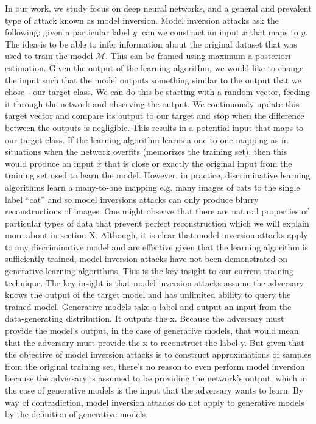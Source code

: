 In our work, we study focus on deep neural networks, and a general and prevalent type of attack known as model inversion. Model inversion attacks ask the following: given a particular label $\mathit{y}$, can we construct an input $\mathit{x}$ that maps to $\mathit{y}$. The idea is to be able to infer information about the original dataset that was used to train the model $\mathcal{M}$. This can be framed using maximum a posteriori estimation. Given the output of the learning algorithm, we would like to change the input such that the model outputs something similar to the output that we chose - our target class. We can do this be starting with a random vector, feeding it through the network and observing the output. We continuously update this target vector and compare its output to our target and stop when the difference between the outputs is negligible. This results in a potential input that maps to our target class. If the learning algorithm learns a one-to-one mapping as in situations when the network overfits (memorizes the training set), then this would produce an input $\hat{\mathit{x}}$ that is close or exactly the original input from the training set used to learn the model. However, in practice, discriminative learning algorithms learn a many-to-one mapping e.g. many images of cats to the single label “cat” and so model inversions attacks can only produce blurry reconstructions of images. One might observe that there are natural properties of particular types of data that prevent perfect reconstruction which we will explain more about in section X. Although, it is clear that model inversion attacks apply to any discriminative model and are effective given that the learning algorithm is sufficiently trained, model inversion attacks have not been demonstrated on generative learning algorithms. This is the key insight to our current training technique. The key insight is that model inversion attacks assume the adversary knows the output of the target model and has unlimited ability to query the trained model. Generative models take a label and output an input from the data-generating distribution. It outputs the x. Because the adversary must provide the model’s output, in the case of generative models, that would mean that the adversary must provide the x to reconstruct the label y. But given that the objective of model inversion attacks is to construct approximations of samples from the original training set, there’s no reason to even perform model inversion because the adversary is assumed to be providing the network’s output, which in the case of generative models is the input that the adversary wants to learn. By way of contradiction, model inversion attacks do not apply to generative models by the definition of generative models.

